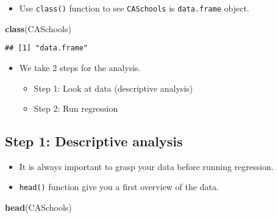 \documentclass[]{book}
\newenvironment{Shaded}{\begin{snugshade}}{\end{snugshade}}
\newcommand{\KeywordTok}[1]{\textcolor[rgb]{0.13,0.29,0.53}{\textbf{#1}}}
\newcommand{\NormalTok}[1]{#1}
\providecommand{\tightlist}{%
  \setlength{\itemsep}{0pt}\setlength{\parskip}{0pt}}
\begin{document}
\begin{itemize}
\tightlist
\item
  Use \texttt{class()} function to see \texttt{CASchools} is \texttt{data.frame} object.
\end{itemize}

\begin{Shaded}
\begin{Highlighting}[]
\KeywordTok{class}\NormalTok{(CASchools)}
\end{Highlighting}
\end{Shaded}

\begin{verbatim}
## [1] "data.frame"
\end{verbatim}

\begin{itemize}
\tightlist
\item
  We take 2 steps for the analysis.

  \begin{itemize}
  \tightlist
  \item
    Step 1: Look at data (descriptive analysis)
  \item
    Step 2: Run regression
  \end{itemize}
\end{itemize}

\hypertarget{step-1-descriptive-analysis}{%
\subsection{Step 1: Descriptive analysis}\label{step-1-descriptive-analysis}}

\begin{itemize}
\tightlist
\item
  It is always important to grasp your data before running regression.
\item
  \texttt{head()} function give you a first overview of the data.
\end{itemize}

\begin{Shaded}
\begin{Highlighting}[]
\KeywordTok{head}\NormalTok{(CASchools)}
\end{Highlighting}
\end{Shaded}
\end{document}
